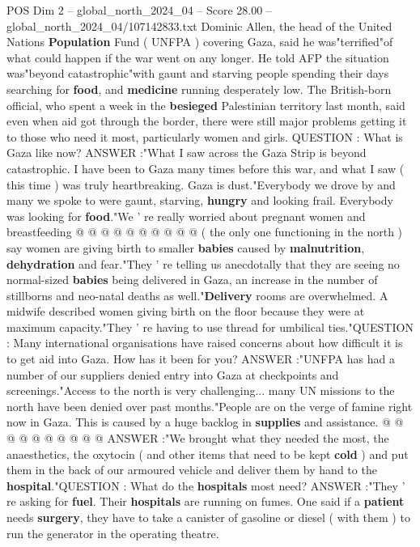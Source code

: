 \begin{textsample}{POS Dim 2 – global\_north\_2024\_04 – Score 28.00 – global\_north\_2024\_04/107142833.txt}  \label{ex:f2_pos_262}
Dominic Allen, the head of the United Nations \textbf{Population} Fund ( UNFPA ) covering Gaza, said he was"terrified"of what could happen if the war went on any longer.
He told AFP the situation was"beyond catastrophic"with gaunt and starving people spending their days searching for \textbf{food}, and \textbf{medicine} running desperately low.
The British-born official, who spent a week in the \textbf{besieged} Palestinian territory last month, said even when aid got through the border, there were still major problems getting it to those who need it most, particularly women and girls.
QUESTION : What is Gaza like now?
ANSWER :"What I saw across the Gaza Strip is beyond catastrophic.
I have been to Gaza many times before this war, and what I saw ( this time ) was truly heartbreaking.
Gaza is dust."Everybody we drove by and many we spoke to were gaunt, starving, \textbf{hungry} and looking frail.
Everybody was looking for \textbf{food}."We ' re really worried about pregnant women and breastfeeding @ @ @ @ @ @ @ @ @ @ ( the only one functioning in the north ) say women are giving birth to smaller \textbf{babies} caused by \textbf{malnutrition}, \textbf{dehydration} and fear."They ' re telling us anecdotally that they are seeing no normal-sized \textbf{babies} being delivered in Gaza, an increase in the number of stillborns and neo-natal deaths as well."\textbf{Delivery} rooms are overwhelmed.
A midwife described women giving birth on the floor because they were at maximum capacity."They ' re having to use thread for umbilical ties."QUESTION : Many international organisations have raised concerns about how difficult it is to get aid into Gaza.
How has it been for you?
ANSWER :"UNFPA has had a number of our suppliers denied entry into Gaza at checkpoints and screenings."Access to the north is very challenging... many UN missions to the north have been denied over past months."People are on the verge of famine right now in Gaza.
This is caused by a huge backlog in \textbf{supplies} and assistance. @ @ @ @ @ @ @ @ @ @ ANSWER :"We brought what they needed the most, the anaesthetics, the oxytocin ( and other items that need to be kept \textbf{cold} ) and put them in the back of our armoured vehicle and deliver them by hand to the \textbf{hospital}."QUESTION : What do the \textbf{hospitals} most need?
ANSWER :"They ' re asking for \textbf{fuel}.
Their \textbf{hospitals} are running on fumes.
One said if a \textbf{patient} needs \textbf{surgery}, they have to take a canister of gasoline or diesel ( with them ) to run the generator in the operating theatre.

\end{textsample}

